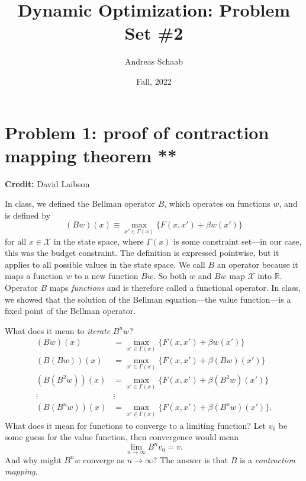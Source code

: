 \documentclass[11pt]{extarticle}
\title{Dynamic Optimization: Problem Set \#2}
\author{Andreas Schaab}
\date{Fall, 2022}
\theoremstyle{plain}
\theoremstyle{definition}
\begin{document}
\maketitle
\thispagestyle{empty}
\setcounter{page}{0}


\vspace{10mm}
\section*{Problem 1: proof of contraction mapping theorem  **}

\textbf{Credit:} David Laibson


\vspace{5mm}
\noindent
In class, we defined the Bellman operator $B$, which operates on functions $w$, and is defined by
\begin{equation*}
	(Bw)(x) \equiv \max_{x' \in \Gamma(x)} \bigg\{ F(x, x') + \beta w(x') \bigg\}
\end{equation*}
for all $x \in \mathcal X$ in the state space, where $\Gamma(x)$ is some constraint set---in our case, this was the budget constraint. The definition is expressed pointwise, but it applies to all possible values in the state space. We call $B$ an operator because it maps a function $w$ to a new function $Bw$. So both $w$ and $Bw$ map $\mathcal X$ into $\mathbb R$. Operator $B$ maps \textit{functions} and is therefore called a functional operator. In class, we showed that the solution of the Bellman equation---the value function---is a fixed point of the Bellman operator.

What does it mean to \textit{iterate} $B^n w$?
\begin{align*}
	(Bw) (x) &= \max_{x' \in \Gamma(x)} \bigg\{ F(x, x') + \beta w(x') \bigg\} \\
	(B(Bw)) (x) &= \max_{x' \in \Gamma(x)} \bigg\{ F(x, x') + \beta (Bw)(x') \bigg\} \\
	(B(B^2w)) (x) &= \max_{x' \in \Gamma(x)} \bigg\{ F(x, x') + \beta (B^2w)(x') \bigg\} \\
	\vdots & \vdots  \\
	(B(B^nw)) (x) &= \max_{x' \in \Gamma(x)} \bigg\{ F(x, x') + \beta (B^nw)(x') \bigg\}.
\end{align*}
What does it mean for functions to converge to a limiting function? Let $v_0$ be some guess for the value function, then convergence would mean
\begin{equation*}
	\lim_{n \to \infty} B^n v_0 = v.
\end{equation*}
And why might $B^n w$ converge as $n \to \infty$? The answer is that $B$ is a \textit{contraction mapping}.
\end{document}
